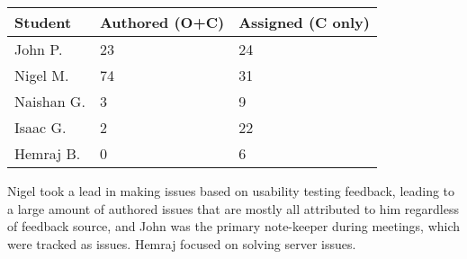 \documentclass{article}
\begin{document}
\begin{table}[H]
\centering
\begin{tabular}{lll}
\toprule
\textbf{Student} & \textbf{Authored (O+C)} & \textbf{Assigned (C only)}\\
\midrule
John P. & 23 & 24 \\
Nigel M. & 74 & 31 \\
Naishan G. & 3 & 9 \\
Isaac G. & 2 & 22 \\
Hemraj B. & 0 & 6 \\
\bottomrule
\end{tabular}
\end{table}

Nigel took a lead in making issues based on usability testing feedback, leading to a large amount of authored issues that are mostly all attributed to him regardless of feedback source, and John was the primary note-keeper during meetings, which were tracked as issues. Hemraj focused on solving server issues.


\end{document}
